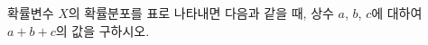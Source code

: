 확률변수 $X$의 확률분포를 표로 나타내면 다음과 같을 때, 상수 $a$, $b$, $c$에 대하여 $a+b+c$의 값을 구하시오.
\par\smallskip\begin{center}\resizebox{\ifdim\width>\linewidth\linewidth\else\width\fi}{!}{}\end{center}
